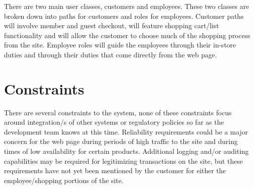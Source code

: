 \documentclass{scrreprt}
\theoremstyle{funreq}
\begin{document}
There are two main user classes, customers and employees. These two classes are broken down into paths for customers and roles for employees. Customer paths will involve member and guest checkout, will feature shopping cart/list functionality and will allow the customer to choose much of the shopping process from the site. Employee roles will guide the employees through their in-store duties and through their duties that come directly from the web page. %

\section{Constraints}
There are several constraints to the system, none of these constraints focus around integration/s of other systems or regulatory policies so far as the development team knows at this time. Reliability requirements could be a major concern for the web page during periods of high traffic to the site and during times of low availability for certain products. Additional logging and/or auditing capabilities may be required for legitimizing transactions on the site, but these requirements have not yet been mentioned by the customer for either the employee/shopping portions of the site. %
\end{document}
